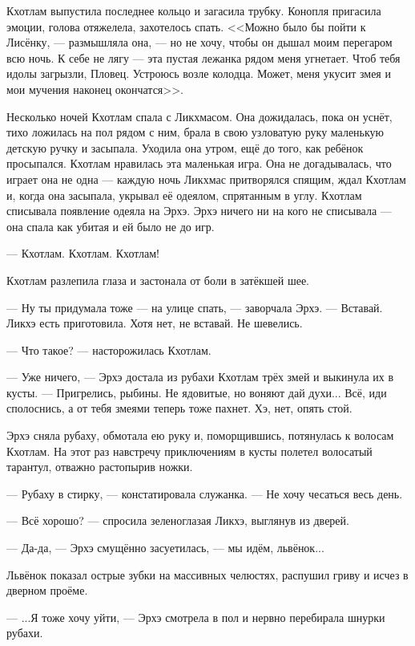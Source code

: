 Кхотлам выпустила последнее кольцо и загасила трубку.
Конопля пригасила эмоции, голова отяжелела, захотелось спать.
<<Можно было бы пойти к Лисёнку, --- размышляла она, --- но не хочу, чтобы он дышал моим перегаром всю ночь.
К себе не лягу --- эта пустая лежанка рядом меня угнетает.
Чтоб тебя идолы загрызли, Пловец.
Устроюсь возле колодца.
Может, меня укусит змея и мои мучения наконец окончатся>>.

Несколько ночей Кхотлам спала с Ликхмасом.
Она дожидалась, пока он уснёт, тихо ложилась на пол рядом с ним, брала в свою узловатую руку маленькую детскую ручку и засыпала.
Уходила она утром, ещё до того, как ребёнок просыпался.
Кхотлам нравилась эта маленькая игра.
Она не догадывалась, что играет она не одна --- каждую ночь Ликхмас притворялся спящим, ждал Кхотлам и, когда она засыпала, укрывал её одеялом, спрятанным в углу.
Кхотлам списывала появление одеяла на Эрхэ.
Эрхэ ничего ни на кого не списывала --- она спала как убитая и ей было не до игр.

\asterism

--- Кхотлам.
Кхотлам.
Кхотлам!

Кхотлам разлепила глаза и застонала от боли в затёкшей шее.

--- Ну ты придумала тоже --- на улице спать, --- заворчала Эрхэ.
--- Вставай.
Ликхэ есть приготовила.
Хотя нет, не вставай.
Не шевелись.

--- Что такое? --- насторожилась Кхотлам.

--- Уже ничего, --- Эрхэ достала из рубахи Кхотлам трёх змей и выкинула их в кусты.
--- Пригрелись, рыбины.
Не ядовитые, но воняют дай духи...
Всё, иди сполоснись, а от тебя змеями теперь тоже пахнет.
Хэ, нет, опять стой.

Эрхэ сняла рубаху, обмотала ею руку и, поморщившись, потянулась к волосам Кхотлам.
На этот раз навстречу приключениям в кусты полетел волосатый тарантул, отважно растопырив ножки.

--- Рубаху в стирку, --- констатировала служанка.
--- Не хочу чесаться весь день.

--- Всё хорошо? --- спросила зеленоглазая Ликхэ, выглянув из дверей.

--- Да-да, --- Эрхэ смущённо засуетилась, --- мы идём, львёнок...

Львёнок показал острые зубки на массивных челюстях, распушил гриву и исчез в дверном проёме.

--- ...Я тоже хочу уйти, --- Эрхэ смотрела в пол и нервно перебирала шнурки рубахи.

